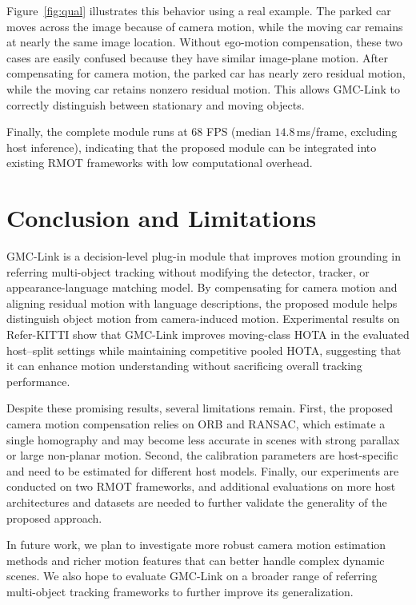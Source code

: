 \documentclass[sigconf,anonymous,nonacm]{acmart}
\begin{document}
Figure~\ref{fig:qual} illustrates this behavior using a real example. The parked car moves across the image because of camera motion, while the moving car remains at nearly the same image location. Without ego-motion compensation, these two cases are easily confused because they have similar image-plane motion. After compensating for camera motion, the parked car has nearly zero residual motion, while the moving car retains nonzero residual motion. This allows GMC-Link to correctly distinguish between stationary and moving objects.

Finally, the complete module runs at $68$ FPS (median $14.8$\,ms/frame, excluding host inference), indicating that the proposed module can be integrated into existing RMOT frameworks with low computational overhead.

\section{Conclusion and Limitations}
\label{sec:conclusion}
GMC-Link is a decision-level plug-in module that improves motion grounding in referring multi-object tracking without modifying the detector, tracker, or appearance-language matching model. By compensating for camera motion and aligning residual motion with language descriptions, the proposed module helps distinguish object motion from camera-induced motion. Experimental results on Refer-KITTI show that GMC-Link improves moving-class HOTA in the evaluated host--split settings while maintaining competitive pooled HOTA, suggesting that it can enhance motion understanding without sacrificing overall tracking performance.

Despite these promising results, several limitations remain. First, the proposed camera motion compensation relies on ORB and RANSAC, which estimate a single homography and may become less accurate in scenes with strong parallax or large non-planar motion. Second, the calibration parameters are host-specific and need to be estimated for different host models. Finally, our experiments are conducted on two RMOT frameworks, and additional evaluations on more host architectures and datasets are needed to further validate the generality of the proposed approach.

In future work, we plan to investigate more robust camera motion estimation methods and richer motion features that can better handle complex dynamic scenes. We also hope to evaluate GMC-Link on a broader range of referring multi-object tracking frameworks to further improve its generalization.



\end{document}
